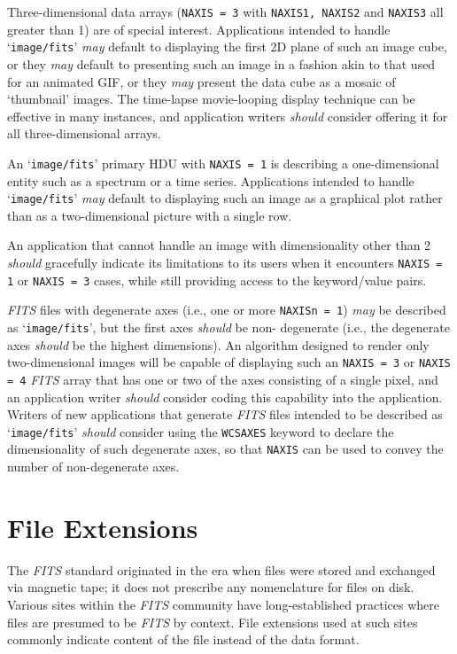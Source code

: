 \documentclass[11pt,makeidx]{book}     %
\begin{document}
  Three-dimensional data arrays ({\tt NAXIS = 3} with {\tt NAXIS1, NAXIS2}
and {\tt NAXIS3}
  all greater than 1) are of special interest.  Applications intended to handle
  `{\tt image/fits}' {\em may} default to displaying the first 2D plane of such an
  image cube, or they {\em may} default to presenting such an image in a
  fashion akin to that used for an animated GIF, or they {\em may} present
  the data cube as a mosaic of `thumbnail' images.  The time-lapse movie-looping
  display technique can be effective in many instances, and application writers 
  {\em should} consider offering it for all three-dimensional arrays.

  An `{\tt image/fits}' primary HDU with {\tt NAXIS = 1} is describing a one-dimensional
  entity such as a spectrum or a time series.  Applications intended to
  handle `{\tt image/fits}' {\em may} default to displaying such an image as a
  graphical plot rather than as a two-dimensional picture with a single
  row.

  An application that cannot handle an image with dimensionality other
  than 2 {\em should} gracefully indicate its limitations to its users when
  it encounters {\tt NAXIS = 1} or {\tt NAXIS = 3} cases, while still providing access
  to the keyword/value pairs.

  {\em FITS\/} files with degenerate axes (i.e., one or more {\tt NAXISn = 1}) {\em may} be
  described as `{\tt image/fits}', but the first axes {\em should} be non-
  degenerate (i.e., the degenerate axes {\em should} be the highest
  dimensions).  An algorithm designed to render only two-dimensional
  images will be capable of displaying such an {\tt NAXIS = 3} or {\tt NAXIS = 4}
   {\em FITS\/}
  array that has one or two of the axes consisting of a single pixel,
  and an application writer {\em should} consider coding this capability into
  the application.  Writers of new applications that generate {\em FITS\/}
  files intended to be described as `{\tt image/fits}' {\em should} consider using
  the {\tt WCSAXES} keyword \cite{greisen06} to declare the dimensionality of such
  degenerate axes, so that {\tt NAXIS} can be used to convey the number of
  non-degenerate axes.

\section{File Extensions}

  The {\em FITS\/} standard originated in the era when files were stored and
  exchanged via magnetic tape; it does not prescribe any nomenclature
  for files on disk.  Various sites within the {\em FITS\/} community have
  long-established practices where files are presumed to be {\em FITS\/} by
  context.  File extensions used at such sites commonly indicate
  content of the file instead of the data format.
\end{document}

